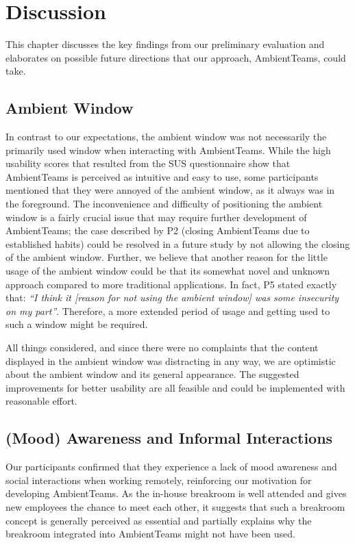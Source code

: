 \chapter{Discussion}
\label{chapter:discussion}
This chapter discusses the key findings from our preliminary evaluation and elaborates on possible future directions that our approach, AmbientTeams, could take.

\section{Ambient Window}
\label{section:ambient_window_discussion}
In contrast to our expectations, the ambient window was not necessarily the primarily used window when interacting with AmbientTeams. While the high usability scores that resulted from the SUS questionnaire show that AmbientTeams is perceived as intuitive and easy to use, some participants mentioned that they were annoyed of the ambient window, as it always was in the foreground. The inconvenience and difficulty of positioning the ambient window is a fairly crucial issue that may require further development of AmbientTeams; the case described by P2 (closing AmbientTeams due to established habits) could be resolved in a future study by not allowing the closing of the ambient window. Further, we believe that another reason for the little usage of the ambient window could be that its somewhat novel and unknown approach compared to more traditional applications. In fact, P5 stated exactly that: \textit{\enquote{I think it [reason for not using the ambient window] was some insecurity on my part}}. Therefore, a more extended period of usage and getting used to such a window might be required.

All things considered, and since there were no complaints that the content displayed in the ambient window was distracting in any way, we are optimistic about the ambient window and its general appearance. The suggested improvements for better usability are all feasible and could be implemented with reasonable effort. 

\section{(Mood) Awareness and Informal Interactions}
Our participants confirmed that they experience a lack of mood awareness and social interactions when working remotely, reinforcing our motivation for developing AmbientTeams. As the in-house breakroom is well attended and gives new employees the chance to meet each other, it suggests that such a breakroom concept is generally perceived as essential and partially explains why the breakroom integrated into AmbientTeams might not have been used. 

